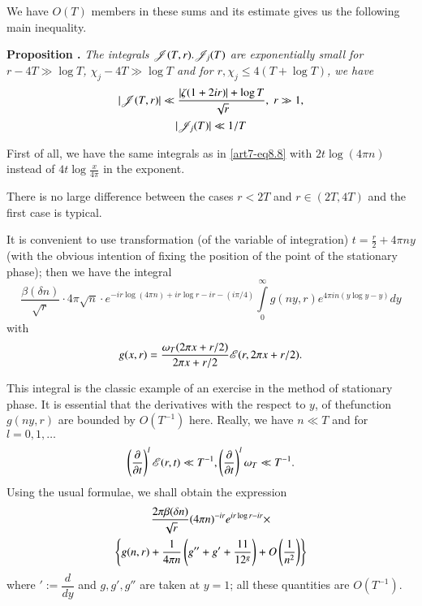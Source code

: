 We have $O(T)$ members in these sums and its estimate gives us the following  main inequality.

\medskip
\noindent
{\bfseries Proposition .\label{art7-prop15}}
\textit{The integrals $\mathscr{J} (T,r). \mathscr{J}_j(T)$ are exponentially small for $r - 4 T \gg \log T$, $\chi_j - 4 T \gg \log T$ and for $r, \chi_j \leq 4 (T + \log T)$, we have}
\begin{gather}
|\mathscr{J} (T, r)| \ll \frac{|\zeta (1+ 2 ir)| + \log T}{\sqrt{r}}, \; r \gg 1, \label{art7-eq8.15}\\
|\mathscr{J}_j(T)| \ll 1/T \label{art7-eq8.16}
\end{gather}

First of all, we have the same integrals as in \eqref{art7-eq8.8} with $2t \log (4\pi n)$ instead of $4 t \log \frac{x}{4\pi}$ in the exponent.

There is no large difference between the cases $r < 2 T$  and $r \in (2 T, 4 T)$ and the first case is typical.

It is convenient to use transformation (of the variable of integration) $t = \frac{r}{2} + 4 \pi n y$ (with the obvious intention of fixing the position of the point of the stationary phase); then we have the integral
\begin{equation}
\frac{\beta (\delta n)}{\sqrt{r}} \cdot 4 \pi \sqrt{n}\cdot e^{-ir \log (4 \pi n) + ir \log r - ir - (i \pi /4)} \int\limits^\infty_0 g (n y, r) e^{4 \pi i n (y \log y - y)} dy \label{art7-eq8.17}
\end{equation}
with 
\begin{equation}
g (x, r) = \frac{\omega_T (2\pi x + r /2)}{2 \pi x+ r/2} \mathscr{E} (r, 2 \pi x+ r /2) . \label{art7-eq8.18}
\end{equation}

This integral is the classic example of an exercise in the method of stationary phase. It is essential that the derivatives with the respect to $y$, of the\pageoriginale function $g (ny, r)$ are bounded by $O(T^{-1})$ here. Really, we have $n \ll T$ and for $l = 0, 1,\ldots$
$$
\left(\frac{\partial}{\partial t} \right)^l \mathscr{E} (r,t) \ll T^{-1}, \left(\frac{\partial}{\partial t} \right)^l \omega_T \ll T^{-1}.
$$
Using the usual formulae, we shall obtain the expression
\begin{gather}
\frac{2 \pi \beta (\delta n)}{\sqrt{r}} (4 \pi n)^{-ir} e^{ir \log r - ir}  \times \label{art7-eq8.19}\\
\left\{g(n,r) + \frac{1}{4 \pi n} \left(g'' + g'+ \frac{11}{12^g} \right) + O\left(\frac{1}{n^2} \right) \right\} \notag
\end{gather}
where $':=\dfrac{d}{dy}$ and $g, g', g''$ are taken at $y=1$; all these quantities are $O(T^{-1})$.

